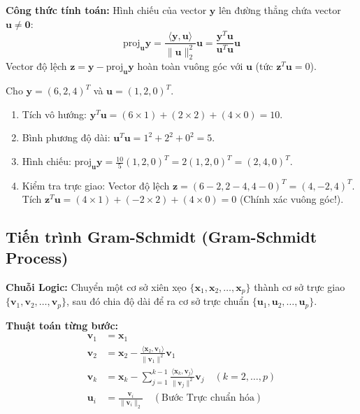 \documentclass[11pt,a4paper]{article}
\begin{document}
\textbf{Công thức tính toán:}
Hình chiếu của vector $\mathbf{y}$ lên đường thẳng chứa vector $\mathbf{u} \neq \mathbf{0}$:
$$\text{proj}_{\mathbf{u}} \mathbf{y} = \frac{\langle \mathbf{y}, \mathbf{u} \rangle}{\|\mathbf{u}\|_2^2} \mathbf{u} = \frac{\mathbf{y}^T \mathbf{u}}{\mathbf{u}^T \mathbf{u}} \mathbf{u}$$
Vector độ lệch $\mathbf{z} = \mathbf{y} - \text{proj}_{\mathbf{u}} \mathbf{y}$ hoàn toàn vuông góc với $\mathbf{u}$ (tức $\mathbf{z}^T \mathbf{u} = 0$).

\begin{examplebox}
Cho $\mathbf{y} = (6, 2, 4)^T$ và $\mathbf{u} = (1, 2, 0)^T$.
\begin{enumerate}
    \item Tích vô hướng: $\mathbf{y}^T \mathbf{u} = (6 \times 1) + (2 \times 2) + (4 \times 0) = 10$.
    \item Bình phương độ dài: $\mathbf{u}^T \mathbf{u} = 1^2 + 2^2 + 0^2 = 5$.
    \item Hình chiếu: $\text{proj}_{\mathbf{u}} \mathbf{y} = \frac{10}{5} (1, 2, 0)^T = 2(1, 2, 0)^T = (2, 4, 0)^T$.
    \item Kiểm tra trực giao: Vector độ lệch $\mathbf{z} = (6-2, 2-4, 4-0)^T = (4, -2, 4)^T$. Tích $\mathbf{z}^T \mathbf{u} = (4 \times 1) + (-2 \times 2) + (4 \times 0) = 0$ (Chính xác vuông góc!).
\end{enumerate}
\end{examplebox}

\subsection{Tiến trình Gram-Schmidt (Gram-Schmidt Process)}
\textbf{Chuỗi Logic:} Chuyển một cơ sở xiên xẹo $\{\mathbf{x}_1, \mathbf{x}_2, \dots, \mathbf{x}_p\}$ thành cơ sở trực giao $\{\mathbf{v}_1, \mathbf{v}_2, \dots, \mathbf{v}_p\}$, sau đó chia độ dài để ra cơ sở trực chuẩn $\{\mathbf{u}_1, \mathbf{u}_2, \dots, \mathbf{u}_p\}$.

\textbf{Thuật toán từng bước:}
\begin{align*}
\mathbf{v}_1 &= \mathbf{x}_1 \\
\mathbf{v}_2 &= \mathbf{x}_2 - \frac{\langle \mathbf{x}_2, \mathbf{v}_1 \rangle}{\|\mathbf{v}_1\|^2} \mathbf{v}_1 \\
\mathbf{v}_k &= \mathbf{x}_k - \sum_{j=1}^{k-1} \frac{\langle \mathbf{x}_k, \mathbf{v}_j \rangle}{\|\mathbf{v}_j\|^2} \mathbf{v}_j \quad (k = 2, \dots, p) \\
\mathbf{u}_i &= \frac{\mathbf{v}_i}{\|\mathbf{v}_i\|_2} \quad (\text{Bước Trực chuẩn hóa})
\end{align*}
\end{document}
